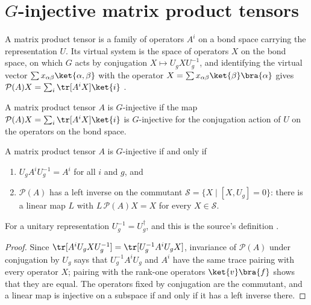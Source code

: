 \section{\texorpdfstring{$G$}{G}-injective matrix product tensors}%
\label{sec:peps_mps_g_injective}

A matrix product tensor is a family of operators $A^i$ on a bond space
carrying the representation $U$. Its virtual system is the space of
operators $X$ on the bond space, on which $G$ acts by conjugation
$X\mapsto U_gXU_g^{-1}$, and identifying the virtual vector
$\sum x_{\alpha\beta}\ket{\alpha,\beta}$ with the operator
$X=\sum x_{\alpha\beta}\ket{\beta}\bra{\alpha}$ gives
$\mathcal{P}(A)X=\sum_i\tr[A^iX]\ket{i}$
\cite[Section~``MPS and PEPS'']{Schuch2010PEPS}.

\begin{definition}%
    \label{def:peps_mps_g_injective}
    \leanok
    A matrix product tensor $A$ is $G$-injective if the map
    $\mathcal{P}(A)X=\sum_i\tr[A^iX]\ket{i}$ is $G$-injective for the
    conjugation action of $U$ on the operators on the bond space.
\end{definition}

\begin{lemma}%
    \label{thm:peps_mps_g_injective_source_form}
    \leanok
    A matrix product tensor $A$ is $G$-injective if and only if
    \begin{enumerate}
        \item $U_gA^iU_g^{-1}=A^i$ for all $i$ and $g$, and
        \item $\mathcal{P}(A)$ has a left inverse on the commutant
              $\mathcal{S}=\{X\mid [X,U_g]=0\}$: there is a linear map $L$
              with $L\,\mathcal{P}(A)X=X$ for every $X\in\mathcal{S}$.
    \end{enumerate}
    For a unitary representation $U_g^{-1}=U_g^\dagger$, and this is the
    source's definition
    \cite[Section~``MPS: the $G$-injective case'']{Schuch2010PEPS}.
\end{lemma}

\begin{proof}\leanok
    Since $\tr[A^iU_gXU_g^{-1}]=\tr[U_g^{-1}A^iU_gX]$, invariance of
    $\mathcal{P}(A)$ under conjugation by $U_g$ says that $U_g^{-1}A^iU_g$
    and $A^i$ have the same trace pairing with every operator $X$; pairing
    with the rank-one operators $\ket{v}\bra{f}$ shows that they are equal.
    The operators fixed by conjugation are the commutant, and a linear map
    is injective on a subspace if and only if it has a left inverse there.
\end{proof}

